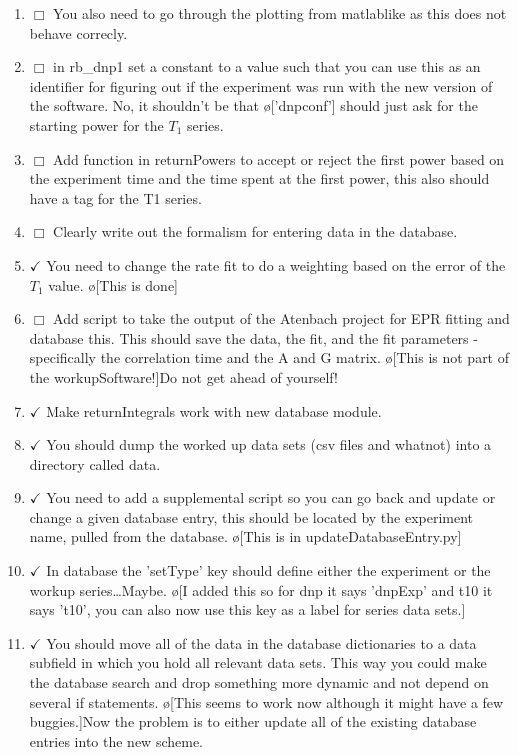 \documentclass[10pt]{book}
\begin{document}
\begin{enumerate}
    \item $\Box$ You also need to go through the plotting from matlablike as this does not behave correcly.
    \item $\Box$ in rb_dnp1 set a constant to a value such that you can use this as an identifier for figuring out if the experiment was run with the new version of the software. No, it shouldn't be that \o['dnpconf']{} should just ask for the starting power for the $T_1$ series.
    \item $\Box$ Add function in returnPowers to accept or reject the first power based on the experiment time and the time spent at the first power, this also should have a tag for the T1 series.
    \item $\Box$ Clearly write out the formalism for entering data in the database.
    \item $\checkmark$ You need to change the rate fit to do a weighting based on the error of the $T_1$ value. \o[This is done]{}
    \item $\Box$ Add script to take the output of the Atenbach project for EPR fitting and database this. This should save the data, the fit, and the fit parameters - specifically the correlation time and the A and G matrix. \o[This is not part of the workupSoftware!]{Do not get ahead of yourself!}
    \item $\checkmark$ Make returnIntegrals work with new database module.
    \item $\checkmark$ You should dump the worked up data sets (csv files and whatnot) into a directory called data.
    \item $\checkmark$ You need to add a supplemental script so you can go back and update or change a given database entry, this should be located by the experiment name, pulled from the database. \o[This is in updateDatabaseEntry.py]{}
    \item $\checkmark$ In database the 'setType' key should define either the experiment or the workup series\ldots Maybe. \o[I added this so for dnp it says 'dnpExp' and t10 it says 't10', you can also now use this key as a label for series data sets.]{}
    \item $\checkmark$ You should move all of the data in the database dictionaries to a data subfield in which you hold all relevant data sets. This way you could make the database search and drop something more dynamic and not depend on several if statements. \o[This seems to work now although it might have a few buggies.]{Now the problem is to either update all of the existing database entries into the new scheme.}

\end{enumerate}
\end{document}
